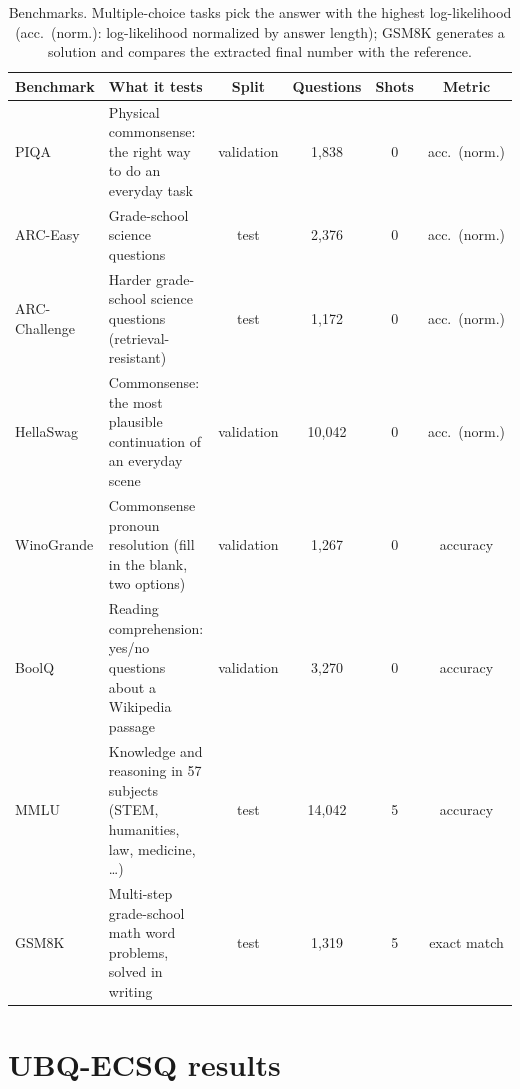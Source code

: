 \documentclass[11pt]{article}
\begin{document}
\begin{table}[!ht]
\centering
\footnotesize
\setlength{\tabcolsep}{4pt}
\begin{tabular}{l>{\raggedright\arraybackslash}p{7.2cm}cccc}
\toprule
Benchmark & What it tests & Split & Questions & Shots & Metric \\
\midrule
PIQA          & Physical commonsense: the right way to do an everyday task & validation & 1{,}838 & 0 & acc.\ (norm.) \\
ARC-Easy      & Grade-school science questions & test & 2{,}376 & 0 & acc.\ (norm.) \\
ARC-Challenge & Harder grade-school science questions (retrieval-resistant) & test & 1{,}172 & 0 & acc.\ (norm.) \\
HellaSwag     & Commonsense: the most plausible continuation of an everyday scene & validation & 10{,}042 & 0 & acc.\ (norm.) \\
WinoGrande    & Commonsense pronoun resolution (fill in the blank, two options) & validation & 1{,}267 & 0 & accuracy \\
BoolQ         & Reading comprehension: yes/no questions about a Wikipedia passage & validation & 3{,}270 & 0 & accuracy \\
MMLU          & Knowledge and reasoning in 57 subjects (STEM, humanities, law, medicine, \dots) & test & 14{,}042 & 5 & accuracy \\
GSM8K         & Multi-step grade-school math word problems, solved in writing & test & 1{,}319 & 5 & exact match \\
\bottomrule
\end{tabular}
\caption{Benchmarks. Multiple-choice tasks pick the answer with the highest log-likelihood (acc.\ (norm.):
log-likelihood normalized by answer length); GSM8K generates a solution and compares the extracted final
number with the reference.}
\label{tab:protocol}
\end{table}

\clearpage
\section{UBQ-ECSQ results}
\end{document}
